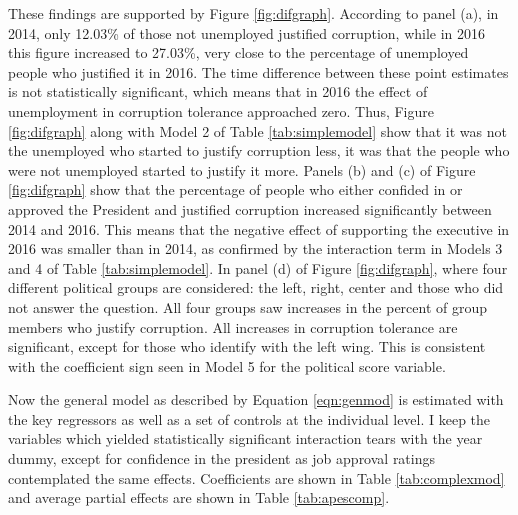 \documentclass[12pt,a4]{article}\usepackage[]{graphicx}\usepackage[]{xcolor}
\begin{document}
These findings are supported by Figure \ref{fig:difgraph}. According to panel (a), in 2014, only 12.03\% of those not unemployed justified corruption, while in 2016 this figure increased to 27.03\%, very close to the percentage of unemployed people who justified it in 2016. The time difference between these point estimates is not statistically significant, which means that in 2016 the effect of unemployment in corruption tolerance approached zero. Thus, Figure \ref{fig:difgraph} along with Model 2 of Table \ref{tab:simplemodel} show that it was not the unemployed who started to justify corruption less, it was that the people who were not unemployed started to justify it more. Panels (b) and (c) of Figure \ref{fig:difgraph} show that the percentage of people who either confided in or approved the President and justified corruption increased significantly  between 2014 and 2016. This means that the negative effect of supporting the executive in 2016 was smaller than in 2014, as confirmed by the interaction term in Models 3 and 4 of Table \ref{tab:simplemodel}. In panel (d) of Figure \ref{fig:difgraph}, where four different political groups are considered: the left, right, center and those who did not answer the question. All four groups saw increases in the percent of group members who justify corruption. All increases in corruption tolerance are significant, except for those who identify with the left wing. This is consistent with the coefficient sign seen in Model 5 for the political score variable. 






Now the general model as described by Equation \ref{eqn:genmod} is estimated with the key regressors as well as a set of controls at the individual level. I keep the variables which yielded statistically significant interaction tears with the year dummy, except for confidence in the president as job approval ratings contemplated the same effects. Coefficients are shown in Table \ref{tab:complexmod} and average partial effects are shown in Table \ref{tab:apescomp}. 

\end{document}

